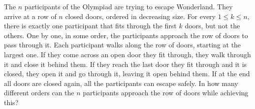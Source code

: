The $n$ participants of the Olympiad are trying to escape Wonderland.
They arrive at a row of $n$ closed doors, ordered in decreasing size.
For every $1\leq k\leq n$, there is exactly one participant that fits through the first $k$ doors,
but not the others.
One by one, in some order, the participants approach the row of doors to pass through it.
Each participant walks along the row of doors, starting at the largest one.
If they come across an open door they fit through, they walk through it and close it behind them.
If they reach the last door they fit through and it is closed, they open it and go through it,
leaving it open behind them.
If at the end all doors are closed again, all the participants can escape safely.
In how many different orders can the $n$ participants approach the row of doors while achieving this?
